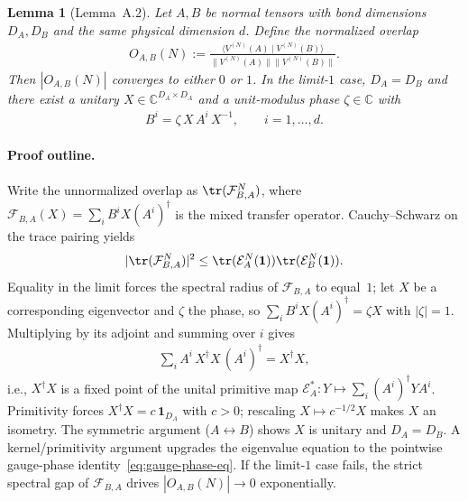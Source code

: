 \documentclass{article}
\theoremstyle{plain}
\newtheorem{lemma}{Lemma}
\begin{document}
\begin{lemma}[Lemma~A.2]
    Let $A, B$ be normal tensors with bond dimensions $D_A, D_B$ and the same
    physical dimension $d$. Define the normalized overlap
    \begin{align}
        O_{A,B}(N) :=
        \frac{\langle V^{(N)}(A) \mid V^{(N)}(B) \rangle}
        {\bigl\|V^{(N)}(A)\bigr\| \bigl\|V^{(N)}(B)\bigr\|}.
        \label{eq:overlap-def}
    \end{align}
    Then $|O_{A,B}(N)|$ converges to either $0$ or $1$. In the limit-$1$
    case, $D_A = D_B$ and there exist a unitary
    $X \in \mathbb{C}^{D_A \times D_A}$ and a unit-modulus phase
    $\zeta \in \mathbb{C}$ with
    \begin{align}
        B^i = \zeta\, X\, A^i\, X^{-1}, \qquad i = 1, \ldots, d.
        \label{eq:gauge-phase-eq}
    \end{align}
\end{lemma}

\paragraph{Proof outline.}
Write the unnormalized overlap as $\tr(\mathcal{F}_{B,A}^N)$, where
$\mathcal{F}_{B,A}(X) = \sum_i B^i X (A^i)^\dagger$ is the mixed transfer
operator. Cauchy--Schwarz on the trace pairing yields
\begin{align}
    |\tr(\mathcal{F}_{B,A}^N)|^2
    \le \tr(\mathcal{E}_A^N(\mathbf{1})) \tr(\mathcal{E}_B^N(\mathbf{1})).
\end{align}
Equality in the limit forces the spectral radius of $\mathcal{F}_{B,A}$
to equal~$1$; let $X$ be a corresponding eigenvector and $\zeta$ the
phase, so $\sum_i B^i X (A^i)^\dagger = \zeta X$ with $|\zeta| = 1$.
Multiplying by its adjoint and summing over $i$ gives
\begin{align}
    \sum_i A^i\, X^\dagger X\, (A^i)^\dagger = X^\dagger X,
\end{align}
i.e., $X^\dagger X$ is a fixed point of the unital primitive map
$\mathcal{E}_A^* : Y \mapsto \sum_i (A^i)^\dagger Y A^i$. Primitivity
forces $X^\dagger X = c\,\mathbf{1}_{D_A}$ with $c > 0$; rescaling
$X \mapsto c^{-1/2} X$ makes $X$ an isometry. The symmetric argument
($A \leftrightarrow B$) shows $X$ is unitary and $D_A = D_B$. A
kernel/primitivity argument upgrades the eigenvalue equation to the
pointwise gauge-phase identity~\eqref{eq:gauge-phase-eq}. If the
limit-$1$ case fails, the strict spectral gap of $\mathcal{F}_{B,A}$
drives $|O_{A,B}(N)| \to 0$ exponentially.
\end{document}
